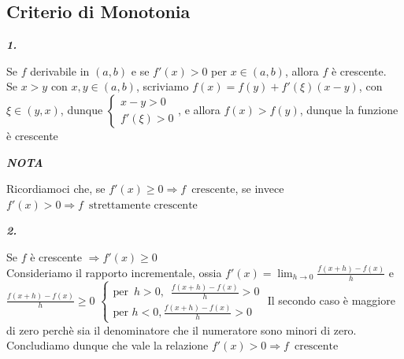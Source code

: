 \documentclass{article}
\theoremstyle{definition}
\begin{document}
\subsection{Criterio di Monotonia}
\begin{center}
    \textbf{\textit{1.}}
\end{center}
Se $f$ derivabile in $(a,b)$ e se $f'(x)>0$ per $x \in (a,b)$, allora $f$ è crescente.
\\
Se $x > y$ con $x,y \in (a,b)$, scriviamo $f(x)=f(y)+f'(\xi)(x-y)$, con $\xi \in (y,x)$, dunque 
$\begin{cases}
    x-y > 0 \\
    f'(\xi) > 0
\end{cases}$, e allora
$f(x) > f(y)$, dunque la funzione è crescente
\begin{center}
    \textbf{\textit{NOTA}}
\end{center}
Ricordiamoci che, se $f'(x) \geqslant 0 \Longrightarrow f \,\,\, \mbox{crescente}$, se invece $f'(x) >0 \Longrightarrow f \,\,\, \mbox{strettamente crescente}$
\begin{center}
    \textbf{\textit{2.}}
\end{center}
Se $f$ è crescente $\Longrightarrow f'(x) \geqslant 0$
\\
Consideriamo il rapporto incrementale, ossia $f'(x)=\lim_{h \to 0}\frac{f(x+h)-f(x)}{h}$ e $\frac{f(x+h)-f(x)}{h} \geqslant 0$
$\begin{cases}
    \mbox{per} \,\,\, h>0, \,\,\, \frac{f(x+h)-f(x)}{h}>0 \\
    \mbox{per} \,\, h<0, \frac{f(x+h)-f(x)}{h} >0
\end{cases}$
Il secondo caso è maggiore di zero perchè sia il denominatore che il numeratore sono minori di zero.
\\
Concludiamo dunque che vale la relazione $f'(x)>0 \Longrightarrow f \,\,\, \mbox{crescente}$
\newpage
\end{document}
